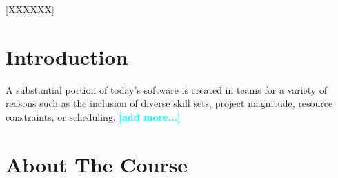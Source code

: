 \documentclass{sig-alternate-05-2015}
\newcommand{\todo}[1]{\textcolor{cyan}{\textbf{[#1]}}}
\newif\ifisnopii
\begin{document}
[XXXXXX]





\section{Introduction}


A substantial portion of today's software is created in teams for a variety of reasons such as the inclusion of diverse skill sets, project magnitude, resource constraints, or scheduling. \todo{add more...}













\section{About The Course}
\label{sec:aboutcourse}


\end{document}
